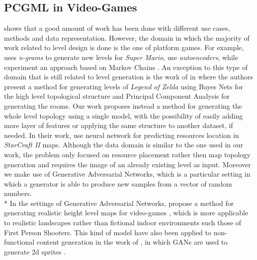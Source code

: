 \subsection{PCGML in Video-Games} 
\citeauthor{PCGML} shows that a good amount of work has been done with different use cases, methods and data representation. However, the domain in which the majority of work related to level design is done is the one of platform games. For example, \citeauthor{mariongrams} \cite{mariongrams} uses \textit{n-grams} to generate new levels for \textit{Super Mario}\cite{game:supermario}, \citeauthor{levelsautoencoder} use \textit{autoencoders}, while \citeauthor{mariomarkovchains} experiment an approach based on Markov Chains \cite{mariomarkovchains}. 
An exception to this type of domain that is still related to level generation is the work of \citeauthor{zeldalevels} in \cite{zeldalevels} where the authors present a method for generating levels of \textit{Legend of Zelda}\cite{game:zelda} using Bayes Nets for the high level topological structure and Principal Component Analysis for generating the rooms. Our work proposes instead a method for generating the whole level topology using a single model, with the possibility of easily adding more layer of features or applying the same structure to another dataset, if needed. \newline
In their work, \citeauthor{resourcelocation} \cite{resourcelocation} use neural network for predicting resources location in \textit{StarCraft II}\cite{game:starcraft} maps. Although the data domain is similar to the one used in our work, the problem only focused on resource placement rather then map topology generation and requires the image of an already existing level as input. Moreover we make use of Generative Adversarial Networks, which is a particular setting in which a generator is able to produce new samples from a vector of random numbers. \\* 
In the settings of Generative Adversarial Networks, \citeauthor{heightgen} propose a method for generating realistic height level maps for video-games \cite{heightgen}, which is more applicable to realistic landscapes rather than fictional indoor environments such those of First Person Shooters. This kind of model have also been applied to non-functional content generation in the work of \citeauthor{spritegen}, in which GANs are used to generate 2d sprites \cite{spritegen}.
 

